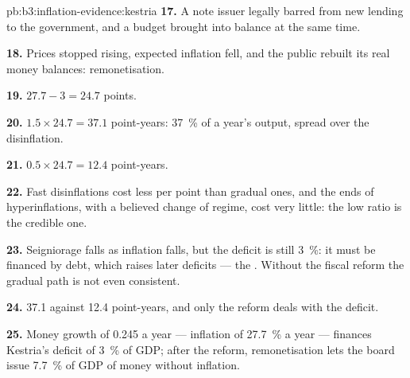 \begin{solution}{pb:b3:inflation-evidence:kestria}
\textbf{17.} A note issuer legally barred from new lending to the government, and a
budget brought into balance at the same time.

\textbf{18.} Prices stopped rising, expected inflation fell, and the public rebuilt its
real money balances: remonetisation.

\textbf{19.} $27.7 - 3 = 24.7$ points.

\textbf{20.} $1.5 \times 24.7 = 37.1$ point-years: 37~\% of a year's output, spread over the
disinflation.

\textbf{21.} $0.5 \times 24.7 = 12.4$ point-years.

\textbf{22.} Fast disinflations cost less per point than gradual ones, and the ends of
hyperinflations, with a believed change of regime, cost very little: the low
ratio is the credible one.

\textbf{23.} Seigniorage falls as inflation falls, but the deficit is still 3~\%: it must be
financed by debt, which raises later deficits --- the . Without
the fiscal reform the gradual path is not even consistent.

\textbf{24.} 37.1 against 12.4 point-years, and only the reform deals with the deficit.

\textbf{25.} Money growth of 0.245 a year --- inflation of 27.7~\% a year --- finances
Kestria's deficit of 3~\% of GDP; after the reform, remonetisation lets the board
issue 7.7~\% of GDP of money without inflation.
\end{solution}
